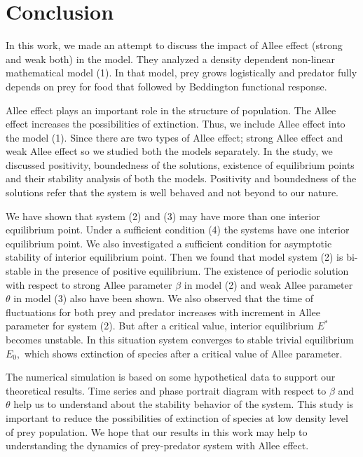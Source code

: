 \documentclass[a4paper, 10pt]{article}
\begin{document}
\section{Conclusion} In this work, we made an attempt to discuss the impact of Allee effect (strong and weak both) in the model. They analyzed a density dependent non-linear mathematical model (1). In that model, prey grows logistically and predator fully depends on prey for food that followed by Beddington functional response.\par
Allee effect plays an important role in the structure of population. The Allee effect increases the possibilities of extinction. Thus, we include Allee effect into the model (1). Since there are two types of Allee effect; strong Allee effect and weak Allee effect so we studied both the models separately. In the study, we discussed positivity, boundedness of the solutions, existence of equilibrium points and their stability analysis of both the models. Positivity and boundedness of the solutions refer that the system is well behaved and not beyond to our nature.\par
We have shown that system (2) and (3) may have more than one interior equilibrium point. Under a sufficient condition (4) the systems have one interior equilibrium point. We also investigated a sufficient condition for asymptotic stability of interior equilibrium point. Then we found that model system (2) is bi-stable in the presence of positive equilibrium. The existence of periodic solution with respect to strong Allee parameter $\beta$ in model (2) and weak Allee parameter $\theta$ in model (3) also have been shown. We also observed that the time of fluctuations for both prey and predator increases with increment in Allee parameter for system (2). But after a critical value, interior equilibrium $E^*$ becomes unstable. In this situation system converges to stable trivial equilibrium $E_0,$ which shows extinction of species after a critical value of Allee parameter.\par

The numerical simulation is based on some hypothetical data to support our theoretical results. Time series and phase portrait diagram with respect to $\beta$ and $\theta$ help us to understand about the stability behavior of the system. This study is important to reduce the possibilities of extinction of species at low density level of prey population. We hope that our results in this work may help to understanding the dynamics of prey-predator system with Allee effect. \\\\
\end{document}
